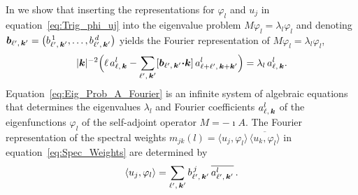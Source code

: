\documentclass[amsa]{ipart}
\begin{document}
In  we show that inserting the
representations for $\varphi_l$ and $u_j$ in equation~\eqref{eq:Trig_phi_uj}
into the eigenvalue problem $M\varphi_l=\lambda_l\varphi_l$ and denoting
$\boldsymbol{b}_{\ell^\prime,\,\boldsymbol{k}^\prime}=\big(b^{\,1}_{\ell^\prime,\,\boldsymbol{k}^\prime},\ldots,b^{\,d}_{\ell^\prime,\,\boldsymbol{k}^\prime}\big)$
yields the Fourier representation of $M\varphi_l=\lambda_l\varphi_l$, 
%
\begin{align}\label{eq:Eig_Prob_A_Fourier}
  |\veck|^{-2}\Big(
  \ell\,a^l_{\ell,\,\veck}
  - \sum_{\ell^\prime,\,\veck^\prime}   
  [\vecb_{\ell^\prime,\,\veck^\prime}\bcdot\veck]\, a^l_{\ell+\ell^\prime,\,\veck+\veck^\prime}
  \Big)
  =\lambda_l\,a^l_{\ell,\,\veck}.  
\end{align}
%
Equation~\eqref{eq:Eig_Prob_A_Fourier} is an infinite system of
algebraic equations that determines the eigenvalues $\lambda_l$ and Fourier 
coefficients $a^l_{\ell,\,\boldsymbol{k}}$ of the eigenfunctions $\varphi_l$ of the
self-adjoint operator $M=-\imath A$. 
The Fourier representation of the spectral weights
$m_{jk}(l)=\langle u_j,\varphi_l\rangle\,\overline{\langle u_k,\varphi_l\rangle}$ in equation~\eqref{eq:Spec_Weights}
are determined by
%
\begin{align}\label{eq:Inner_Products_Gen}
  \langle u_j,\varphi_l\rangle=\sum_{\ell^\prime,\,\veck^\prime}
   b^{\,j}_{\ell^\prime,\,\veck^\prime}\,\overline{a^l_{\ell^\prime,\,\veck^\prime}}\,.
\end{align}
%
\end{document}
